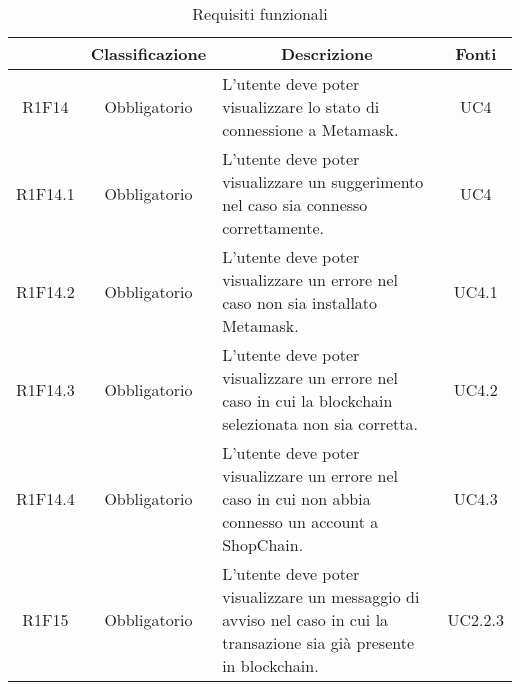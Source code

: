 \begin{table}[H]
    \centering
    \renewcommand{\arraystretch}{1.8}
    \begin{tabular}{c | c | p{6cm} | c}
        \rowcolor[HTML]{125E28}
        \multicolumn{1}{c}{\color[HTML]{FFFFFF} \textbf{Codice}}          &
        \multicolumn{1}{c}{\color[HTML]{FFFFFF} \textbf{Classificazione}} &
        \multicolumn{1}{c}{\color[HTML]{FFFFFF} \textbf{Descrizione}}     &
        \multicolumn{1}{c}{\color[HTML]{FFFFFF} \textbf{Fonti}}                                                                                                                                                                   \\
        \hline
        R1F14                                                             & Obbligatorio & L'utente deve poter visualizzare lo stato di connessione a Metamask\glo{}.                                       & UC4                      \\
        R1F14.1                                                           & Obbligatorio & L'utente deve poter visualizzare un suggerimento nel caso sia connesso correttamente.                      & UC4                      \\
        R1F14.2                                                           & Obbligatorio & L'utente deve poter visualizzare un errore nel caso non sia installato Metamask\glo{}.                                             & UC4.1   \\
        R1F14.3                                                           & Obbligatorio & L'utente deve poter visualizzare un errore nel caso in cui la blockchain selezionata non sia corretta.                       & UC4.2   \\
        R1F14.4                                                           & Obbligatorio & L'utente deve poter visualizzare un errore nel caso in cui non abbia connesso un account a ShopChain.                        & UC4.3   \\
        R1F15                                                             & Obbligatorio & L'utente deve poter visualizzare un messaggio di avviso nel caso in cui la transazione sia già presente in blockchain\glo{}. & UC2.2.3 \\
    \end{tabular}
    \caption{Requisiti funzionali}
\end{table}

